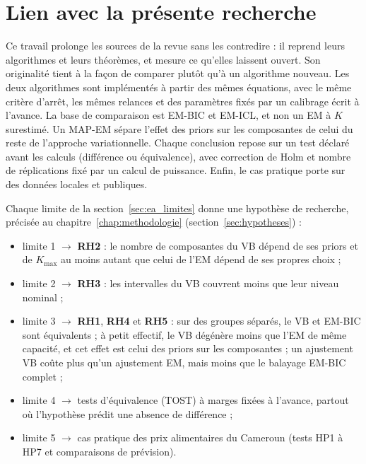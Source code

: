 \section{Lien avec la présente recherche}\label{sec:ea_lien}
Ce travail prolonge les sources de la revue sans les contredire : il reprend leurs algorithmes et leurs théorèmes, et mesure ce qu'elles laissent ouvert. Son originalité tient à la façon de comparer plutôt qu'à un algorithme nouveau. Les deux algorithmes sont implémentés à partir des mêmes équations, avec le même critère d'arrêt, les mêmes relances et des paramètres fixés par un calibrage écrit à l'avance. La base de comparaison est EM-BIC et EM-ICL, et non un EM à $K$ surestimé. Un MAP-EM sépare l'effet des priors sur les composantes de celui du reste de l'approche variationnelle. Chaque conclusion repose sur un test déclaré avant les calculs (différence ou équivalence), avec correction de Holm et nombre de réplications fixé par un calcul de puissance. Enfin, le cas pratique porte sur des données locales et publiques.

Chaque limite de la section~\ref{sec:ea_limites} donne une hypothèse de recherche, précisée au chapitre~\ref{chap:methodologie} (section~\ref{sec:hypotheses}) :
\begin{itemize}
\item limite 1 $\to$ \textbf{RH2} : le nombre de composantes du VB dépend de ses priors et de $K_{\max}$ au moins autant que celui de l'EM dépend de ses propres choix ;
\item limite 2 $\to$ \textbf{RH3} : les intervalles du VB couvrent moins que leur niveau nominal ;
\item limite 3 $\to$ \textbf{RH1}, \textbf{RH4} et \textbf{RH5} : sur des groupes séparés, le VB et EM-BIC sont équivalents ; à petit effectif, le VB dégénère moins que l'EM de même capacité, et cet effet est celui des priors sur les composantes ; un ajustement VB coûte plus qu'un ajustement EM, mais moins que le balayage EM-BIC complet ;
\item limite 4 $\to$ tests d'équivalence (TOST) à marges fixées à l'avance, partout où l'hypothèse prédit une absence de différence ;
\item limite 5 $\to$ cas pratique des prix alimentaires du Cameroun (tests HP1 à HP7 et comparaisons de prévision).
\end{itemize}


